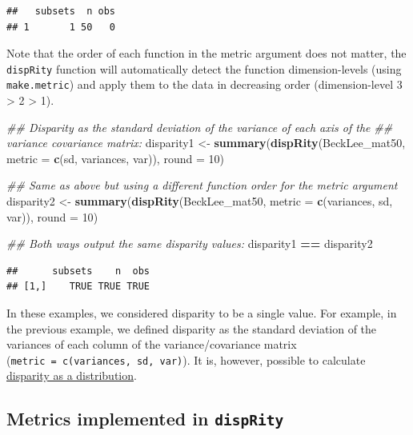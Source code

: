 \documentclass[]{book}
\newenvironment{Shaded}{\begin{snugshade}}{\end{snugshade}}
\newcommand{\CommentTok}[1]{\textcolor[rgb]{0.56,0.35,0.01}{\textit{#1}}}
\newcommand{\DataTypeTok}[1]{\textcolor[rgb]{0.13,0.29,0.53}{#1}}
\newcommand{\DecValTok}[1]{\textcolor[rgb]{0.00,0.00,0.81}{#1}}
\newcommand{\KeywordTok}[1]{\textcolor[rgb]{0.13,0.29,0.53}{\textbf{#1}}}
\newcommand{\NormalTok}[1]{#1}
\newcommand{\OperatorTok}[1]{\textcolor[rgb]{0.81,0.36,0.00}{\textbf{#1}}}
\newcommand{\StringTok}[1]{\textcolor[rgb]{0.31,0.60,0.02}{#1}}
\begin{document}
\begin{verbatim}
##   subsets  n obs
## 1       1 50   0
\end{verbatim}

Note that the order of each function in the metric argument does not matter, the \texttt{dispRity} function will automatically detect the function dimension-levels (using \texttt{make.metric}) and apply them to the data in decreasing order (dimension-level 3 \textgreater{} 2 \textgreater{} 1).

\begin{Shaded}
\begin{Highlighting}[]
\CommentTok{## Disparity as the standard deviation of the variance of each axis of the}
\CommentTok{## variance covariance matrix:}
\NormalTok{disparity1 <-}\StringTok{ }\KeywordTok{summary}\NormalTok{(}\KeywordTok{dispRity}\NormalTok{(BeckLee_mat50,}
                               \DataTypeTok{metric =} \KeywordTok{c}\NormalTok{(sd, variances, var)),}
                      \DataTypeTok{round =} \DecValTok{10}\NormalTok{)}

\CommentTok{## Same as above but using a different function order for the metric argument}
\NormalTok{disparity2 <-}\StringTok{ }\KeywordTok{summary}\NormalTok{(}\KeywordTok{dispRity}\NormalTok{(BeckLee_mat50,}
                               \DataTypeTok{metric =} \KeywordTok{c}\NormalTok{(variances, sd, var)),}
                      \DataTypeTok{round =} \DecValTok{10}\NormalTok{)}

\CommentTok{## Both ways output the same disparity values:}
\NormalTok{disparity1 }\OperatorTok{==}\StringTok{ }\NormalTok{disparity2}
\end{Highlighting}
\end{Shaded}

\begin{verbatim}
##      subsets    n  obs
## [1,]    TRUE TRUE TRUE
\end{verbatim}

In these examples, we considered disparity to be a single value.
For example, in the previous example, we defined disparity as the standard deviation of the variances of each column of the variance/covariance matrix (\texttt{metric\ =\ c(variances,\ sd,\ var)}).
It is, however, possible to calculate \protect\hyperlink{disparity-as-a-distribution}{disparity as a distribution}.

\hypertarget{metrics-implemented-in-disprity}{%
\subsection{\texorpdfstring{Metrics implemented in \texttt{dispRity}}{Metrics implemented in dispRity}}\label{metrics-implemented-in-disprity}}
\end{document}
